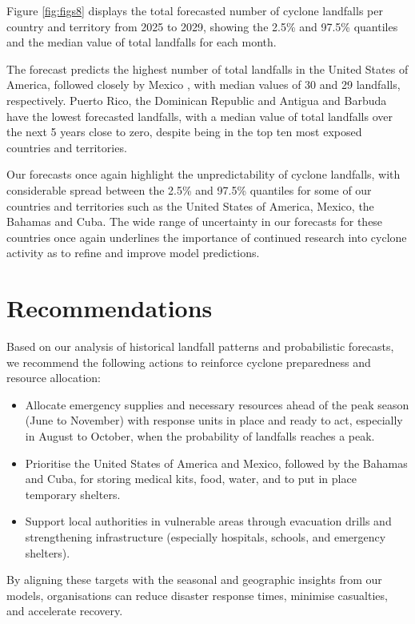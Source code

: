 \documentclass[
]{article}
\providecommand{\tightlist}{%
  \setlength{\itemsep}{0pt}\setlength{\parskip}{0pt}}
\begin{document}
Figure \ref{fig:figs8} displays the total forecasted number of cyclone landfalls per country and territory from 2025 to 2029, showing the 2.5\% and 97.5\% quantiles and the median value of total landfalls for each month.

The forecast predicts the highest number of total landfalls in the United States of America, followed closely by Mexico , with median values of 30 and 29 landfalls, respectively. Puerto Rico, the Dominican Republic and Antigua and Barbuda have the lowest forecasted landfalls, with a median value of total landfalls over the next 5 years close to zero, despite being in the top ten most exposed countries and territories.

Our forecasts once again highlight the unpredictability of cyclone landfalls, with considerable spread between the 2.5\% and 97.5\% quantiles for some of our countries and territories such as the United States of America, Mexico, the Bahamas and Cuba. The wide range of uncertainty in our forecasts for these countries once again underlines the importance of continued research into cyclone activity as to refine and improve model predictions.

\section{Recommendations}\label{recommendations}

Based on our analysis of historical landfall patterns and probabilistic forecasts, we recommend the following actions to reinforce cyclone preparedness and resource allocation:

\begin{itemize}
\tightlist
\item
  Allocate emergency supplies and necessary resources ahead of the peak season (June to November) with response units in place and ready to act, especially in August to October, when the probability of landfalls reaches a peak.
\item
  Prioritise the United States of America and Mexico, followed by the Bahamas and Cuba, for storing medical kits, food, water, and to put in place temporary shelters.
\item
  Support local authorities in vulnerable areas through evacuation drills and strengthening infrastructure (especially hospitals, schools, and emergency shelters).
\end{itemize}

By aligning these targets with the seasonal and geographic insights from our models, organisations can reduce disaster response times, minimise casualties, and accelerate recovery.
\end{document}
